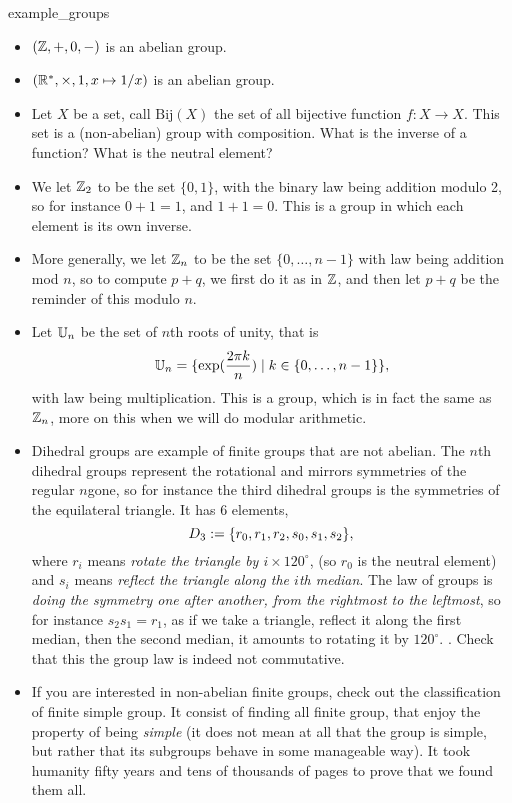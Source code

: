 \begin{cexp}{}{example_groups}
    \begin{itemize}
        \item \( (\mathbb{Z}, +, 0, -) \) is an abelian group.
        \item \( (\mathbb{R}^*, \times, 1, x \mapsto 1/x) \) is an abelian group.
        \item Let \( X \) be a set, call \( \mathrm{Bij}(X) \) the set of all bijective function \( f : X \to X \). This set is a (non-abelian) group with composition. What is the inverse of a function? What is the neutral element? 
        \item We let \( \mathbb{Z}_2 \) to be the set \( \{ 0, 1 \} \), with the binary law being addition modulo 2, so for instance \( 0 + 1 = 1 \), and \( 1 + 1 = 0 \). This is a group in which each element is its own inverse. 
        \item More generally, we let \( \mathbb{Z}_n \) to be the set \( \{ 0, \dots, n-1 \} \) with law being addition mod \( n \), so to compute \( p + q \), we first do it as in \( \mathbb{Z} \), and then let \( p + q \) be the reminder of this modulo \( n \).
        \item Let \( \mathbb{U}_n \) be the set of \( n \)th roots of unity, that is
        \begin{equation*}
            \mathbb{U}_n = \{ \exp(\frac{2\pi k}{n}) \mid k \in \{0, \dots, n - 1\} \},
        \end{equation*}
        with law being multiplication. This is a group, which is in fact the same as \( \mathbb{Z}_n \), more on this when we will do modular arithmetic.
        \item Dihedral groups are example of finite groups that are not abelian. The \( n \)th dihedral groups represent the rotational and mirrors symmetries of the regular \( n \)gone, so for instance the third dihedral groups is the symmetries of the equilateral triangle. It has \( 6 \) elements, 
        \begin{equation*}
            D_3 := \{ r_0, r_1, r_2, s_0, s_1, s_2 \},    
        \end{equation*}
        where \( r_i \) means \textit{rotate the triangle by \( i \times 120^\circ \)}, (so \( r_0 \) is the neutral element) and \( s_i \) means \textit{reflect the triangle along the \( i \)th median}. The law of groups is \textit{doing the symmetry one after another, from the rightmost to the leftmost}, so for instance \( s_2s_1 = r_1 \), as if we take a triangle, reflect it along the first median, then the second median, it amounts to rotating it by \( 120^\circ \). . Check that this the group law is indeed not commutative.
        \item If you are interested in non-abelian finite groups, check out the classification of finite simple group. It consist of finding all finite group, that enjoy the property of being \textit{simple} (it does not mean at all that the group is simple, but rather that its subgroups behave in some manageable way). It took humanity fifty years and tens of thousands of pages to prove that we found them all.  
    \end{itemize}    
\end{cexp}

